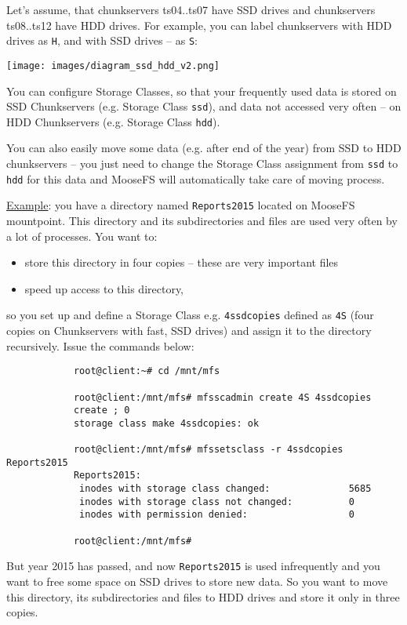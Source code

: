 \documentclass[a4paper,11pt,english]{report}
\def\code#1{\texttt{#1}}
\begin{document}
			Let's assume, that chunkservers ts04..ts07 have SSD drives and chunkservers ts08..ts12 have HDD drives. For example, you can label chunkservers with HDD drives as \code{H}, and with SSD drives -- as \code{S}:
			
			
			\bigskip
			\texttt{[image: images/diagram\_ssd\_hdd\_v2.png]}
			
			\bigskip
			You can configure Storage Classes, so that your frequently used data is stored on SSD Chunkservers (e.g. Storage Class \code{ssd}), and data not accessed very often  -- on HDD Chunkservers (e.g. Storage Class \code{hdd}).
			
			You can also easily move some data (e.g. after end of the year) from SSD to HDD chunkservers -- you just need to change the Storage Class assignment from \code{ssd} to \code{hdd} for this data and MooseFS will automatically take care of moving process.
			
			\underline{Example}: you have a directory named \code{Reports2015} located on MooseFS mountpoint. This directory and its subdirectories and files are used very often by a lot of processes. You want to:
			
			\begin{itemize}
				\item store this directory in four copies -- these are very important files
				\item speed up access to this directory,
			\end{itemize}
			
			so you set up and define a Storage Class e.g. \code{4ssdcopies} defined as \code{4S} (four copies on Chunkservers with fast, SSD drives) and assign it to the directory recursively. Issue the commands below:
			
			\begin{lstlisting}
			root@client:~# cd /mnt/mfs
			
			root@client:/mnt/mfs# mfsscadmin create 4S 4ssdcopies
			create ; 0
			storage class make 4ssdcopies: ok
			
			root@client:/mnt/mfs# mfssetsclass -r 4ssdcopies Reports2015
			Reports2015:
			 inodes with storage class changed:              5685
			 inodes with storage class not changed:          0
			 inodes with permission denied:                  0
			 
			root@client:/mnt/mfs#
			\end{lstlisting}
			
			But year 2015 has passed, and now \code{Reports2015} is used infrequently and you want to free some space on SSD drives to store new data. So you want to move this directory, its subdirectories and files to HDD drives and store it only in three copies.
			
\end{document}
